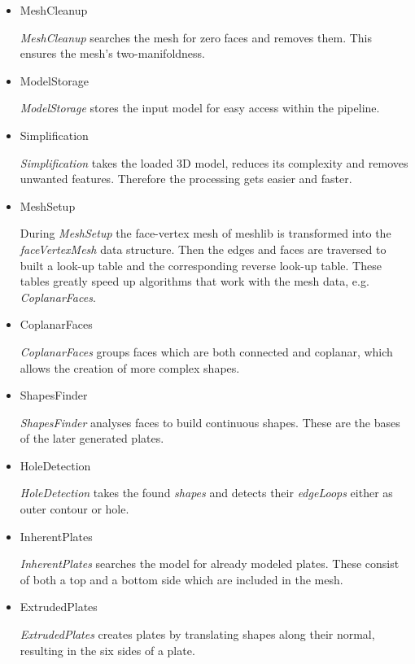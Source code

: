 \documentclass[../ClassicThesis.tex]{subfiles}
\begin{document}
\begin{itemize}
    \item MeshCleanup

\emph{MeshCleanup} searches the mesh for zero faces and removes them. This ensures the mesh's two-manifoldness.


\item ModelStorage

\emph{ModelStorage} stores the input model for easy access within the pipeline.


\item Simplification

\emph{Simplification} takes the loaded 3D model, reduces its complexity and removes unwanted features. Therefore the processing gets easier and faster. 


\item MeshSetup

During \emph{MeshSetup} the face-vertex mesh of meshlib is transformed into the \emph{faceVertexMesh} data structure. Then the edges and faces are traversed to built a look-up table and the corresponding reverse look-up table. These tables greatly speed up algorithms that work with the mesh data, e.g. \emph{CoplanarFaces}.


\item CoplanarFaces

\emph{CoplanarFaces} groups faces which are both connected and coplanar, which allows the creation of more complex shapes.


\item ShapesFinder

\emph{ShapesFinder} analyses faces to build continuous shapes. These are the bases of the later generated plates.


\item HoleDetection

\emph{HoleDetection} takes the found \emph{shapes} and detects their \emph{edgeLoops} either as outer contour or hole.


\item InherentPlates

\emph{InherentPlates} searches the model for already modeled plates. These consist of both a top and a bottom side which are included in the mesh.


\item ExtrudedPlates

\emph{ExtrudedPlates} creates plates by translating shapes along their normal, resulting in the six sides of a plate.



\end{itemize}
\end{document}
